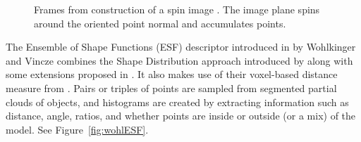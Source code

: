 \documentclass[11pt,a4paper]{kth-mag}
\begin{document}
\begin{figure}
  \centering
  \caption{Frames from construction of a spin image \cite{johnson1997spin}. The
    image plane spins around the oriented point normal and accumulates points.}
  \label{fig:spinimg}
\end{figure}

The Ensemble of Shape Functions (ESF) descriptor introduced in
\cite{wohlkinger2011ensemble} by Wohlkinger and Vincze combines the Shape
Distribution approach introduced by \cite{osada2002shape} along with some
extensions proposed in \cite{ip2002using}. It also makes use of their
voxel-based distance measure from \cite{wohlkinger2011shapedist}. Pairs or triples of
points are sampled from segmented partial clouds of objects, and histograms are
created by extracting information such as distance, angle, ratios, and whether
points are inside or outside (or a mix) of the model. See
Figure~\ref{fig:wohlESF}.
\end{document}
